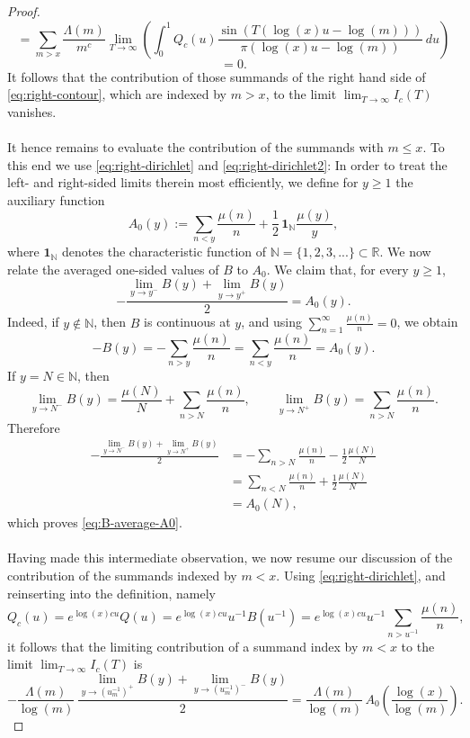 \documentclass[a4paper,10pt]{amsart}
\theoremstyle{definition}
\numberwithin{equation}{section}
\def\R{\mathbb R}
\def\N{\mathbb N}
\begin{document}
\begin{proof}
$$$$
$$
=\sum_{m>x}\frac{\Lambda(m)}{m^c} \lim_{T\to\infty} \left(\int_0^1Q_c(u) \frac{\sin(T(\log(x)u-\log(m)))}{\pi(\log(x)u-\log(m))}\,du\right)$$
$$=0.
$$
It follows that the contribution of those summands of the right hand side of \eqref{eq:right-contour}, which are indexed by $m>x$, to the limit $\lim_{T\to\infty}I_c(T)$ vanishes. \\\\
It hence remains to evaluate the contribution of the summands with $m\leq x$. To this end we use \eqref{eq:right-dirichlet} and \eqref{eq:right-dirichlet2}: In order to treat the left- and right-sided limits therein most efficiently, we define for $y\ge1$ the auxiliary function 
\begin{equation}\label{eq:A0}
A_0(y):=\sum_{n<y}\frac{\mu(n)}n+\frac12\,\mathbf 1_{\mathbb N}\frac{\mu(y)}y,
\end{equation}
where $\mathbf 1_{\mathbb N}$ denotes the characteristic function of $\N=\{1,2,3,...\}\subset\R$. We now relate the averaged one-sided values of $B$ to $A_0$.  We
claim that, for every $y\ge1$,
\begin{equation}\label{eq:B-average-A0}
-\frac{\lim_{y\to y^-}B(y)+\lim_{y\to y^+}B(y)}2=A_0(y).
\end{equation}
Indeed, if $y\notin\mathbb N$, then $B$ is continuous at $y$, and using $\sum_{n=1}^{\infty}\frac{\mu(n)}n=0$, we obtain
$$
-B(y)=-\sum_{n>y}\frac{\mu(n)}n=\sum_{n<y}\frac{\mu(n)}n=A_0(y).
$$
If $y=N\in\mathbb N$, then
$$
\lim_{y\to N^-}B(y)=\frac{\mu(N)}N+\sum_{n>N}\frac{\mu(n)}n,\qquad\lim_{y\to N^+}B(y)=\sum_{n>N}\frac{\mu(n)}n.
$$
Therefore
$$
\begin{aligned}
-\frac{\lim_{y\to N^-}B(y)+\lim_{y\to N^+}B(y)}2
&=-\sum_{n>N}\frac{\mu(n)}n-\frac12\frac{\mu(N)}N\\
&=\sum_{n<N}\frac{\mu(n)}n+\frac12\frac{\mu(N)}N\\
&=A_0(N),
\end{aligned}
$$
which proves \eqref{eq:B-average-A0}.\\\\
Having made this intermediate observation, we now resume our discussion of the contribution of the summands indexed by $m<x$. Using \eqref{eq:right-dirichlet}, and reinserting into the definition, namely
$$
Q_c(u)=e^{\log(x)cu}Q(u)=e^{\log(x)cu}u^{-1} B(u^{-1})=e^{\log(x)cu} u^{-1}\sum_{n>u^{-1}}\frac{\mu(n)}{n},
$$
it follows that the limiting contribution of a summand index by $m<x$ to the limit $\lim_{T\to\infty}I_c(T)$ is
$$
-\frac{\Lambda(m)}{\log(m)}\,\frac{\lim_{y\to (u^{-1}_m)^+}B(y)+\lim_{y\to (u^{-1}_m)^-} B(y)}2 =\frac{\Lambda(m)}{\log(m)}\,A_0\!\left(\frac{\log(x)}{\log(m)}\right).
$$
\end{proof}
\end{document}
